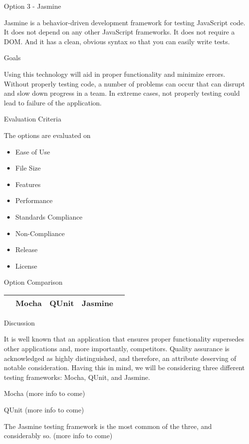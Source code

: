 \documentclass[letterpaper, 10pt, draftclsnofoot, compsoc, onecolumn]{IEEEtran}
\begin{document}
{\medskip
{\noindent Option 3 - Jasmine \par}
{\noindent Jasmine is a behavior-driven development framework for testing JavaScript code. It does not depend on any other JavaScript frameworks. It does not require a DOM. And it has a clean, obvious syntax so that you can easily write tests. \cite{Jasmine}  \par}

\medskip
{\noindent Goals \par}
{\noindent Using this technology will aid in proper functionality and minimize errors. Without properly testing code, a number of problems can occur that can disrupt and slow down progress in a team. In extreme cases, not properly testing could lead to failure of the application. \par}

\medskip
\newpage
{\noindent Evaluation Criteria \par}
{\noindent The options are evaluated on 

\begin{itemize}
\item Ease of Use
\item File Size
\item Features
\item Performance
\item Standards Compliance
\item Non-Compliance
\item Release 
\item License
\end{itemize}

 \par}


\newpage
{\noindent Option Comparison \par}
\tablehead{}
\begin{supertabular}{|p{2cm}|p{2.5cm}|p{2.5cm}|p{2.5cm}|p{2.5cm}|}
\hline
& Mocha & QUnit & Jasmine\\ \hline
\end{supertabular}

\newpage
{\noindent Discussion \par}
{\noindent It is well known that an application that ensures proper functionality supersedes other applications and, more importantly, competitors. Quality assurance is acknowledged as highly distinguished, and therefore, an attribute deserving of notable consideration. Having this in mind, we will be considering three different testing frameworks: Mocha, QUnit, and Jasmine. \par}
{\noindent Mocha (more info to come) \par}
{\noindent QUnit (more info to come) \par}
{\noindent The Jasmine testing framework is the most common of the three, and considerably so. (more info to come) \par}

}
\end{document}
